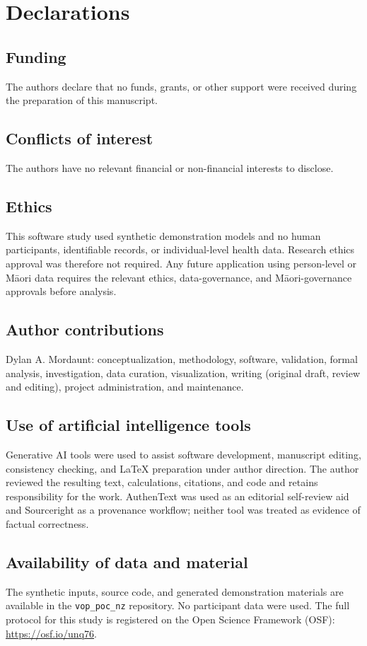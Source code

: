 \documentclass[article]{jss}
\newcommand{\pkg}[1]{\texttt{#1}}
\begin{document}
\section*{Declarations}

\subsection*{Funding}
The authors declare that no funds, grants, or other support were received during the preparation of this manuscript.

\subsection*{Conflicts of interest}
The authors have no relevant financial or non-financial interests to disclose.

\subsection*{Ethics}
This software study used synthetic demonstration models and no human
participants, identifiable records, or individual-level health data. Research
ethics approval was therefore not required. Any future application using
person-level or M\={a}ori data requires the relevant ethics, data-governance, and
M\={a}ori-governance approvals before analysis.

\subsection*{Author contributions}
Dylan A. Mordaunt: conceptualization, methodology, software, validation,
formal analysis, investigation, data curation, visualization, writing
(original draft, review and editing), project administration, and
maintenance.

\subsection*{Use of artificial intelligence tools}
Generative AI tools were used to assist software development, manuscript
editing, consistency checking, and LaTeX preparation under author direction.
The author reviewed the resulting text, calculations, citations, and code and
retains responsibility for the work. AuthenText was used as an editorial
self-review aid and Sourceright as a provenance workflow; neither tool was
treated as evidence of factual correctness.

\subsection*{Availability of data and material}
The synthetic inputs, source code, and generated demonstration materials are available in the \pkg{vop\_poc\_nz} repository. No participant data were used.
The full protocol for this study is registered on the Open Science Framework (OSF): \url{https://osf.io/unq76}.
\end{document}
